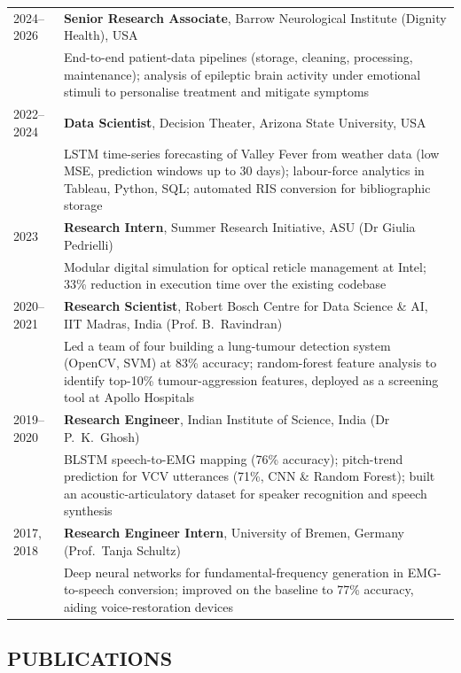 \documentclass[a4paper, 11pt]{article}
\begin{document}
{\noindent
\begin{tabularx}{\textwidth}{@{}lX@{}}
2024--2026     & \textbf{Senior Research Associate}, Barrow Neurological Institute (Dignity Health), USA \\
           & End-to-end patient-data pipelines (storage, cleaning, processing, maintenance); analysis of epileptic brain activity under emotional stimuli to personalise treatment and mitigate symptoms \\[2pt]
2022--2024 & \textbf{Data Scientist}, Decision Theater, Arizona State University, USA \\
           & LSTM time-series forecasting of Valley Fever from weather data (low MSE, prediction windows up to 30 days); labour-force analytics in Tableau, Python, SQL; automated RIS conversion for bibliographic storage \\[2pt]
2023       & \textbf{Research Intern}, Summer Research Initiative, ASU (Dr Giulia Pedrielli) \\
           & Modular digital simulation for optical reticle management at Intel; 33\% reduction in execution time over the existing codebase \\[2pt]
2020--2021 & \textbf{Research Scientist}, Robert Bosch Centre for Data Science \& AI, IIT Madras, India (Prof. B.\ Ravindran) \\
           & Led a team of four building a lung-tumour detection system (OpenCV, SVM) at 83\% accuracy; random-forest feature analysis to identify top-10\% tumour-aggression features, deployed as a screening tool at Apollo Hospitals \\[2pt]
2019--2020 & \textbf{Research Engineer}, Indian Institute of Science, India (Dr P.\ K.\ Ghosh) \\
           & BLSTM speech-to-EMG mapping (76\% accuracy); pitch-trend prediction for VCV utterances (71\%, CNN \& Random Forest); built an acoustic-articulatory dataset for speaker recognition and speech synthesis \\[2pt]
2017, 2018 & \textbf{Research Engineer Intern}, University of Bremen, Germany (Prof.\ Tanja Schultz) \\
           & Deep neural networks for fundamental-frequency generation in EMG-to-speech conversion; improved on the baseline to 77\% accuracy, aiding voice-restoration devices \\
\end{tabularx}

\smallskip

\subsection{PUBLICATIONS}
\vspace{2pt}

}
\end{document}
